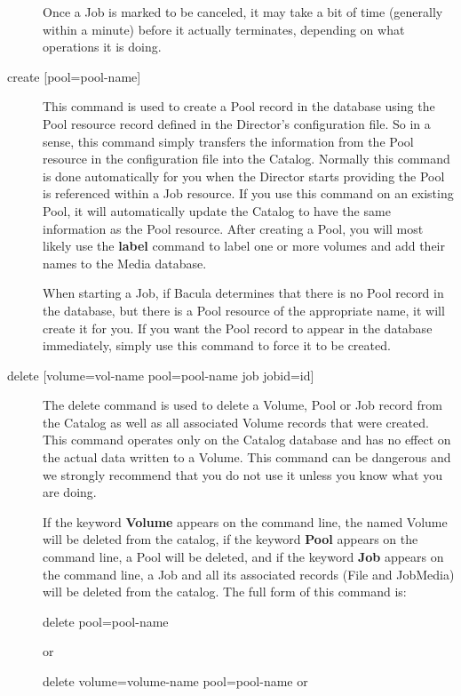 \begin{description}
Once a Job is marked to be canceled, it may take a bit of time  (generally
within a minute) before it actually terminates,  depending on what operations
it is doing. 

\item [{ create [pool=\lt{}pool-name\gt{}]}]
   \index[console]{create [pool }
   This command is used to  create a Pool record in the database using the Pool
resource record  defined in the Director's configuration file. So in a sense,
this  command simply transfers the information from the Pool resource in  the
configuration file into the Catalog. Normally this command is  done
automatically for you when the Director starts providing the  Pool is
referenced within a Job resource. If you use this command  on an existing
Pool, it will automatically update the Catalog to  have the same information
as the Pool resource. After creating a  Pool, you will most likely use the
{\bf label} command to label  one or more volumes and add their names to the
Media database.  

When starting a Job, if Bacula determines that there is  no Pool record in the
database, but there is a Pool resource of the  appropriate name, it will
create it for you. If you want the Pool  record to appear in the database
immediately, simply use this  command to force it to be created. 

\item [{ delete [volume=\lt{}vol-name\gt{} pool=\lt{}pool-name\gt{}  job
   jobid=\lt{}id\gt{}] }]
The delete command is used to delete  a Volume, Pool or Job record from the
Catalog as well as all  associated Volume records that were created. This
command operates  only on the Catalog database and has no effect on the actual
data  written to a Volume. This command can be dangerous and we strongly 
recommend that you do not use it unless you know what you are  doing. 

If the keyword {\bf Volume} appears on the command  line, the named Volume
will be deleted from the catalog, if the  keyword {\bf Pool} appears on the
command line, a Pool will be  deleted, and if the keyword {\bf Job} appears on
the command line,  a Job and all its associated records (File and JobMedia)
will be  deleted from the catalog. The full form of this command is:  

delete pool=\lt{}pool-name\gt{}

or  

delete volume=\lt{}volume-name\gt{} pool=\lt{}pool-name\gt{}  or  


\end{description}

